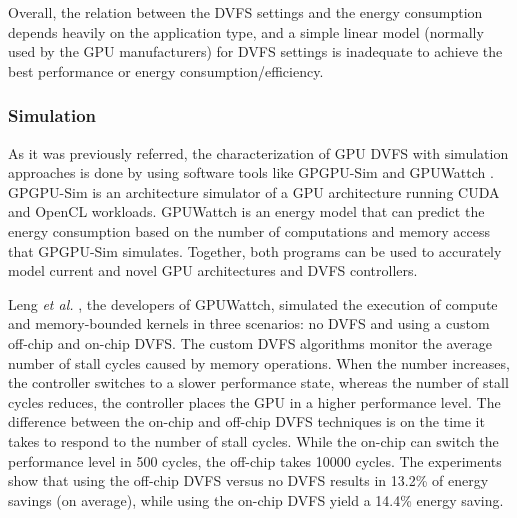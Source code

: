 Overall, the relation between the DVFS settings and the energy consumption depends heavily on the application type, and a simple linear model (normally used by the GPU manufacturers) for DVFS settings is inadequate to achieve the best performance or energy consumption/efficiency.

\subsubsection{Simulation}

As it was previously referred, the characterization of GPU DVFS with simulation approaches is done by using software tools like GPGPU-Sim \cite{noauthor_gpgpu-sim/gpgpu-sim_distribution_2019} and GPUWattch \cite{noauthor_gpu_2011} \cite{leng_gpuwattch:_2013}. GPGPU-Sim is an architecture simulator of a GPU architecture running CUDA and OpenCL workloads. GPUWattch is an energy model that can predict the energy consumption based on the number of computations and memory access that GPGPU-Sim simulates. Together, both programs can be used to accurately model current and novel GPU architectures and DVFS controllers.

Leng \textit{et al.} \cite{leng_gpuwattch:_2013}, the developers of GPUWattch, simulated the execution of compute and memory-bounded kernels in three scenarios: no DVFS and using a custom off-chip and on-chip DVFS. The custom DVFS algorithms monitor the average number of stall cycles caused by memory operations. When the number increases, the controller switches to a slower performance state, whereas the number of stall cycles reduces, the controller places the GPU in a higher performance level. The difference between the on-chip and off-chip DVFS techniques is on the time it takes to respond to the number of stall cycles. While the on-chip can switch the performance level in 500 cycles, the off-chip takes 10000 cycles. The experiments show that using the off-chip DVFS versus no DVFS results in 13.2\% of energy savings (on average), while using the on-chip DVFS yield a 14.4\% energy saving.

